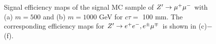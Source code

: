 \begin{figure}[!htb]
    \caption{Signal efficiency maps of the signal MC sample of $Z' \rightarrow \mu^{+}\mu^{-}$ with (a) $m=500$ and (b) $m=1000$ GeV for $c\tau=$ 100 mm. The corresponding efficiency maps for $Z' \rightarrow e^{+}e^{-}, e^{\pm}\mu^{\mp}$ is shown in (c)$-$(f).}
    \label{fig:signal_eff_map}
\end{figure}







